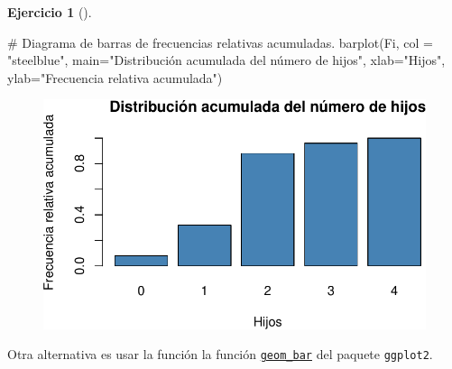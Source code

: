 \documentclass[
  a4paper,
]{scrreport}
\newenvironment{Shaded}{\begin{snugshade}}{\end{snugshade}}
\newcommand{\AttributeTok}[1]{\textcolor[rgb]{0.40,0.45,0.13}{#1}}
\newcommand{\CommentTok}[1]{\textcolor[rgb]{0.37,0.37,0.37}{#1}}
\newcommand{\FunctionTok}[1]{\textcolor[rgb]{0.28,0.35,0.67}{#1}}
\newcommand{\NormalTok}[1]{\textcolor[rgb]{0.00,0.23,0.31}{#1}}
\newcommand{\StringTok}[1]{\textcolor[rgb]{0.13,0.47,0.30}{#1}}
\theoremstyle{definition}
\newtheorem{exercise}{Ejercicio}[chapter]
\theoremstyle{remark}
\begin{document}
\begin{exercise}[]
\begin{tcolorbox}
\begin{figure}[H]
{}

\end{figure}

\begin{Shaded}
\begin{Highlighting}[]
\CommentTok{\# Diagrama de barras de frecuencias relativas acumuladas.}
\FunctionTok{barplot}\NormalTok{(Fi, }\AttributeTok{col =} \StringTok{"steelblue"}\NormalTok{, }\AttributeTok{main=}\StringTok{"Distribución acumulada del número de hijos"}\NormalTok{, }\AttributeTok{xlab=}\StringTok{"Hijos"}\NormalTok{, }\AttributeTok{ylab=}\StringTok{"Frecuencia relativa acumulada"}\NormalTok{)}
\end{Highlighting}
\end{Shaded}

\begin{figure}[H]

{\centering \includegraphics{./03-frecuencias-graficos_files/figure-pdf/unnamed-chunk-6-4.pdf}

}

\end{figure}

\end{tcolorbox}

\begin{tcolorbox}[enhanced jigsaw, coltitle=black, breakable, bottomtitle=1mm, colbacktitle=quarto-callout-tip-color!10!white, rightrule=.15mm, opacityback=0, opacitybacktitle=0.6, left=2mm, colframe=quarto-callout-tip-color-frame, title=\textcolor{quarto-callout-tip-color}{\faLightbulb}\hspace{0.5em}{Solución 2}, toprule=.15mm, toptitle=1mm, arc=.35mm, colback=white, titlerule=0mm, bottomrule=.15mm, leftrule=.75mm]

Otra alternativa es usar la función la función
\href{https://aprendeconalf.es/manual-r/07-graficos.html\#diagramas-de-barras}{\texttt{geom\_bar}}
del paquete \texttt{ggplot2}.


\end{tcolorbox}
\end{exercise}
\end{document}
